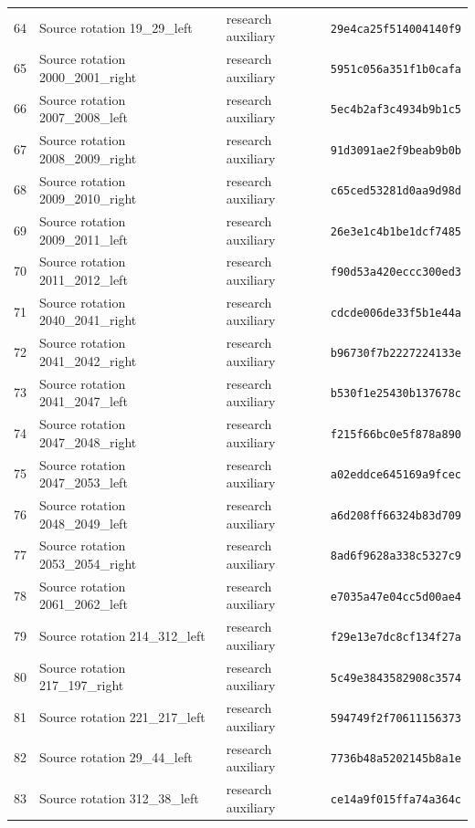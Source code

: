 \begin{longtable}{p{.06\linewidth}>{\raggedright\arraybackslash}p{.30\linewidth}>{\raggedright\arraybackslash}p{.21\linewidth}p{.31\linewidth}}
64 & Source rotation 19\_29\_left & research auxiliary & \texttt{29e4ca25f514004140f9} \\
65 & Source rotation 2000\_2001\_right & research auxiliary & \texttt{5951c056a351f1b0cafa} \\
66 & Source rotation 2007\_2008\_left & research auxiliary & \texttt{5ec4b2af3c4934b9b1c5} \\
67 & Source rotation 2008\_2009\_right & research auxiliary & \texttt{91d3091ae2f9beab9b0b} \\
68 & Source rotation 2009\_2010\_right & research auxiliary & \texttt{c65ced53281d0aa9d98d} \\
69 & Source rotation 2009\_2011\_left & research auxiliary & \texttt{26e3e1c4b1be1dcf7485} \\
70 & Source rotation 2011\_2012\_left & research auxiliary & \texttt{f90d53a420eccc300ed3} \\
71 & Source rotation 2040\_2041\_right & research auxiliary & \texttt{cdcde006de33f5b1e44a} \\
72 & Source rotation 2041\_2042\_right & research auxiliary & \texttt{b96730f7b2227224133e} \\
73 & Source rotation 2041\_2047\_left & research auxiliary & \texttt{b530f1e25430b137678c} \\
74 & Source rotation 2047\_2048\_right & research auxiliary & \texttt{f215f66bc0e5f878a890} \\
75 & Source rotation 2047\_2053\_left & research auxiliary & \texttt{a02eddce645169a9fcec} \\
76 & Source rotation 2048\_2049\_left & research auxiliary & \texttt{a6d208ff66324b83d709} \\
77 & Source rotation 2053\_2054\_right & research auxiliary & \texttt{8ad6f9628a338c5327c9} \\
78 & Source rotation 2061\_2062\_left & research auxiliary & \texttt{e7035a47e04cc5d00ae4} \\
79 & Source rotation 214\_312\_left & research auxiliary & \texttt{f29e13e7dc8cf134f27a} \\
80 & Source rotation 217\_197\_right & research auxiliary & \texttt{5c49e3843582908c3574} \\
81 & Source rotation 221\_217\_left & research auxiliary & \texttt{594749f2f70611156373} \\
82 & Source rotation 29\_44\_left & research auxiliary & \texttt{7736b48a5202145b8a1e} \\
83 & Source rotation 312\_38\_left & research auxiliary & \texttt{ce14a9f015ffa74a364c} \\

\end{longtable}
